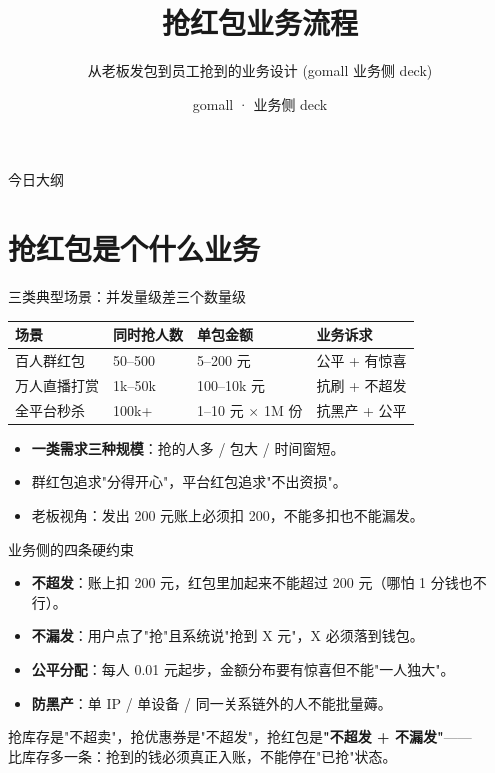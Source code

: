

\title{抢红包业务流程}
\subtitle{从老板发包到员工抢到的业务设计 (gomall 业务侧 deck)}
\author{gomall · 业务侧 deck}
\date{}



\maketitle

\begin{frame}{今日大纲}
\tableofcontents
\end{frame}

\section{抢红包是个什么业务}

\begin{frame}{三类典型场景：并发量级差三个数量级}
{\small
\begin{tabular}{@{}llll@{}}
\toprule
场景 & 同时抢人数 & 单包金额 & 业务诉求 \\
\midrule
百人群红包    & 50--500       & 5--200 元   & 公平 + 有惊喜 \\
万人直播打赏  & 1k--50k       & 100--10k 元 & 抗刷 + 不超发 \\
全平台秒杀    & 100k+         & 1--10 元 $\times$ 1M 份 & 抗黑产 + 公平 \\
\bottomrule
\end{tabular}
}
\vspace{2mm}
\begin{itemize}
  \item \textbf{一类需求三种规模}：抢的人多 / 包大 / 时间窗短。
  \item 群红包追求"分得开心"，平台红包追求"不出资损"。
  \item 老板视角：发出 200 元账上必须扣 200，不能多扣也不能漏发。
\end{itemize}
\end{frame}

\begin{frame}{业务侧的四条硬约束}
\begin{itemize}
  \item \textbf{不超发}：账上扣 200 元，红包里加起来不能超过 200 元（哪怕 1 分钱也不行）。
  \item \textbf{不漏发}：用户点了"抢"且系统说"抢到 X 元"，X 必须落到钱包。
  \item \textbf{公平分配}：每人 0.01 元起步，金额分布要有惊喜但不能"一人独大"。
  \item \textbf{防黑产}：单 IP / 单设备 / 同一关系链外的人不能批量薅。
\end{itemize}
\vspace{2mm}
\small 抢库存是"不超卖"，抢优惠券是"不超发"，抢红包是\textbf{"不超发 + 不漏发"}——\\
比库存多一条：抢到的钱必须真正入账，不能停在"已抢"状态。
\end{frame}

